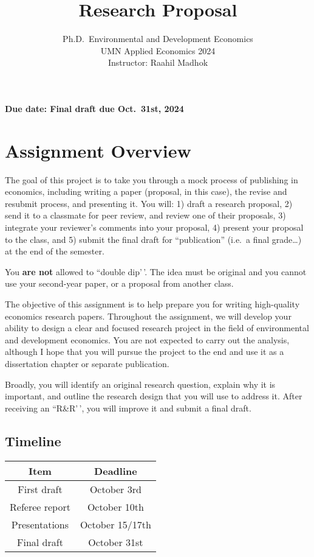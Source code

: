 \documentclass[
]{article}
\title{Research Proposal}
\subtitle{Ph.D.~Environmental and Development Economics\\
UMN Applied Economics 2024\\
Instructor: Raahil Madhok}
\author{}
\date{\vspace{-2.5em}}
\begin{document}
\maketitle

\textbf{Due date: Final draft due Oct.~31st, 2024}

\hypertarget{assignment-overview}{%
\section{Assignment Overview}\label{assignment-overview}}

The goal of this project is to take you through a mock process of publishing in economics, including writing a paper (proposal, in this case), the revise and resubmit process, and presenting it. You will: 1) draft a research proposal, 2) send it to a classmate for peer review, and review one of their proposals, 3) integrate your reviewer's comments into your proposal, 4) present your proposal to the class, and 5) submit the final draft for ``publication'' (i.e.~a final grade\ldots) at the end of the semester.

You \textbf{are not} allowed to ``double dip'\,'. The idea must be original and you cannot use your second-year paper, or a proposal from another class.

The objective of this assignment is to help prepare you for writing high-quality economics research papers. Throughout the assignment, we will develop your ability to design a clear and focused research project in the field of environmental and development economics. You are not expected to carry out the analysis, although I hope that you will pursue the project to the end and use it as a dissertation chapter or separate publication.

Broadly, you will identify an original research question, explain why it is important, and outline the research design that you will use to address it. After receiving an ``R\&R'\,', you will improve it and submit a final draft.

\hypertarget{timeline}{%
\subsection{Timeline}\label{timeline}}

\begin{table}[ht]
\begin{tabular}{|c|c|}
\hline
\textbf{Item} & \textbf{Deadline} \\ \hline
First draft     & October 3rd     \\ \hline
Referee report    & October 10th     \\ \hline
Presentations    & October 15/17th     \\ \hline
Final draft    & October 31st     \\ \hline
\end{tabular}
\end{table}
\end{document}
